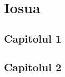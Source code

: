 \documentclass[12pt,a4paper]{article}
\begin{document}

\section{Iosua}

\subsection{Capitolul 1}

\subsection{Capitolul 2}

\end{document}
